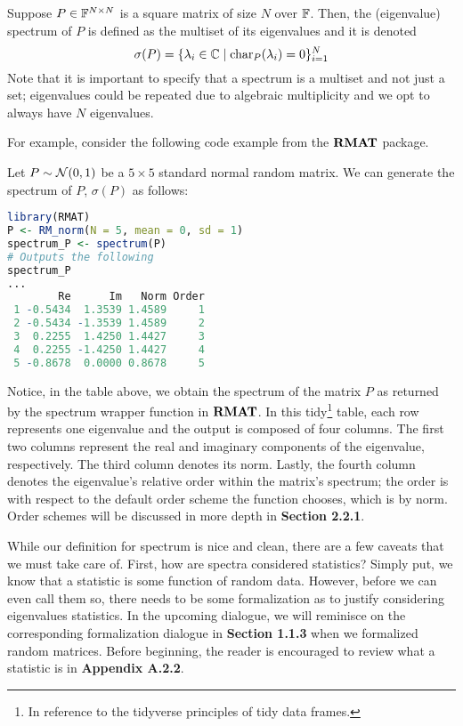 \bigskip
\bigskip
\begin{definition}[Spectrum]
Suppose $P \in \mathbb{F}^{N \times N}$ is a square matrix of size $N$ over $\mathbb{F}$. Then, the (eigenvalue) spectrum of $P$ is defined as the multiset of its eigenvalues and it is denoted
$$\sigma(P) = \{\lambda_i \in \mathbb{C} \mid \text{char}_P(\lambda_i) = 0 \}_{i=1}^N$$
Note that it is important to specify that a spectrum is a multiset and not just a set; eigenvalues could be repeated due to algebraic multiplicity and we opt to always have $N$ eigenvalues.
\end{definition}

\medskip
For example, consider the following code example from the ${\textbf{RMAT}}$ package.

\begin{code}
Let $P \sim \mathcal{N}(0,1)$ be a $5 \times 5$ standard normal random matrix. We can generate the spectrum of $P$, $\sigma(P)$ as follows:
\end{code}

\begin{lstlisting}[language=R]
library(RMAT)
P <- RM_norm(N = 5, mean = 0, sd = 1)
spectrum_P <- spectrum(P)
# Outputs the following
spectrum_P
...
        Re      Im   Norm Order
 1 -0.5434  1.3539 1.4589     1
 2 -0.5434 -1.3539 1.4589     2
 3  0.2255  1.4250 1.4427     3
 4  0.2255 -1.4250 1.4427     4
 5 -0.8678  0.0000 0.8678     5
\end{lstlisting}

Notice, in the table above, we obtain the spectrum of the matrix $P$ as returned by the spectrum wrapper function in ${\textbf{RMAT}}$.
In this tidy\footnote{In reference to the tidyverse principles of tidy data frames.} table, each row represents one eigenvalue and the output is composed of four columns.
The first two columns represent the real and imaginary components of the eigenvalue, respectively. The third column denotes its norm. Lastly, the fourth column denotes the eigenvalue's
relative order within the matrix's spectrum; the order is with respect to the default order scheme the function chooses, which is by norm. Order schemes will be discussed in more depth in \textbf{Section 2.2.1}.

\newpage


While our definition for spectrum is nice and clean, there are a few caveats that we must take care of.
First, how are spectra considered statistics? Simply put, we know that a statistic is some function of random data.
However, before we can even call them so, there needs to be some formalization as to justify considering eigenvalues statistics.
In the upcoming dialogue, we will reminisce on the corresponding formalization dialogue in \textbf{Section 1.1.3} when we formalized random matrices.
Before beginning, the reader is encouraged to review what a statistic is in \textbf{Appendix A.2.2}.

